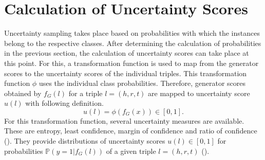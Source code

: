 \section{Calculation of Uncertainty Scores}
\label{sec:calculation_of_uncertainty_scores}
%
Uncertainty sampling takes place based on probabilities with which the instances belong to the respective classes.
After determining the calculation of probabilities in the previous section, the calculation of uncertainty scores can take place at this point.
For this, a transformation function is used to map from the generator scores to the uncertainty scores of the individual triples.
This transformation function $\phi$ uses the individual class probabilities.
Therefore, generator scores obtained by $f_G(l)$ for a triple $l = (h,r,t)$ are  mapped to uncertainty score $u(l)$ with following definition.
\begin{equation} \label{eqn:uncertainty_function}
    u(l) = \phi(f_G(x)) \in  [0,1].
\end{equation}
For this transformation function, several uncertainty measures are available.
These are entropy, least confidence, margin of confidence and ratio of confidence ().
They provide distributions of uncertainty scores $u(l) \in [0, 1]$ for probabilities $\mathbb{P}(y = 1 | f_G(l))$ of a given triple $l = (h, r, t)$ ().
\clearpage
